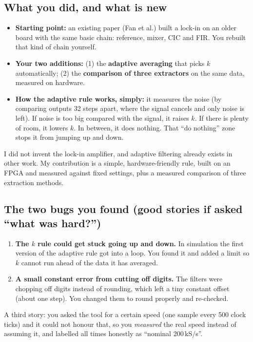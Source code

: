 \documentclass[11pt,a4paper]{article}
\begin{document}
\subsection*{What you did, and what is new}
\begin{itemize}
\item \textbf{Starting point:} an existing paper (Fan et al.) built a lock-in on an older board with the same basic chain: reference, mixer, CIC and FIR. You rebuilt that kind of chain yourself.
\item \textbf{Your two additions:} (1) the \textbf{adaptive averaging} that picks $k$ automatically; (2) the \textbf{comparison of three extractors} on the same data, measured on hardware.
\item \textbf{How the adaptive rule works, simply:} it measures the noise (by comparing outputs 32 steps apart, where the signal cancels and only noise is left). If noise is too big compared with the signal, it raises $k$. If there is plenty of room, it lowers $k$. In between, it does nothing. That ``do nothing'' zone stops it from jumping up and down.
\end{itemize}
\begin{say}
I did not invent the lock-in amplifier, and adaptive filtering already exists in other work. My contribution is a simple, hardware-friendly rule, built on an FPGA and measured against fixed settings, plus a measured comparison of three extraction methods.
\end{say}

\subsection*{The two bugs you found (good stories if asked ``what was hard?'')}
\begin{enumerate}
\item \textbf{The $k$ rule could get stuck going up and down.} In simulation the first version of the adaptive rule got into a loop. You found it and added a limit so $k$ cannot run ahead of the data it has averaged.
\item \textbf{A small constant error from cutting off digits.} The filters were chopping off digits instead of rounding, which left a tiny constant offset (about one step). You changed them to round properly and re-checked.
\end{enumerate}
A third story: you asked the tool for a certain speed (one sample every 500 clock ticks) and it could not honour that, so you \emph{measured} the real speed instead of assuming it, and labelled all times honestly as ``nominal 200\,kS/s''.
\end{document}
